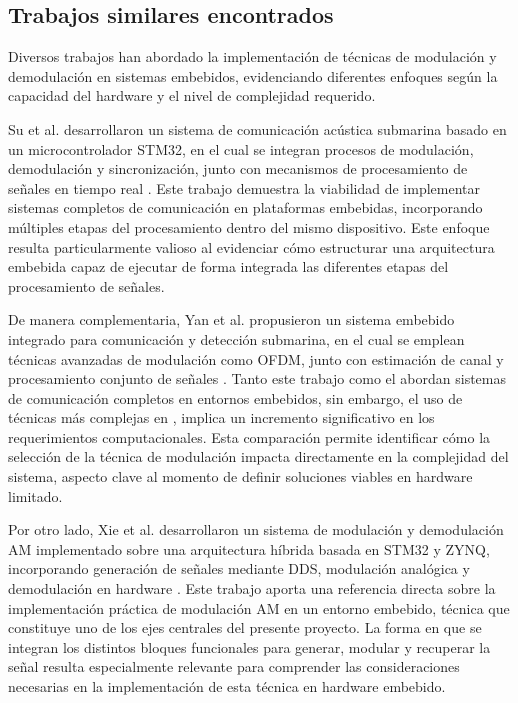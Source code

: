 \subsection{Trabajos similares encontrados}

Diversos trabajos han abordado la implementación de técnicas de modulación y demodulación en sistemas embebidos, evidenciando diferentes enfoques según la capacidad del hardware y el nivel de complejidad requerido.

Su et al. desarrollaron un sistema de comunicación acústica submarina basado en un microcontrolador STM32, en el cual se integran procesos de modulación, demodulación y sincronización, junto con mecanismos de procesamiento de señales en tiempo real \cite{stm32_comm}. Este trabajo demuestra la viabilidad de implementar sistemas completos de comunicación en plataformas embebidas, incorporando múltiples etapas del procesamiento dentro del mismo dispositivo. Este enfoque resulta particularmente valioso al evidenciar cómo estructurar una arquitectura embebida capaz de ejecutar de forma integrada las diferentes etapas del procesamiento de señales.

De manera complementaria, Yan et al. propusieron un sistema embebido integrado para comunicación y detección submarina, en el cual se emplean técnicas avanzadas de modulación como OFDM, junto con estimación de canal y procesamiento conjunto de señales \cite{yan2025_underwater}. Tanto este trabajo como el \cite{stm32_comm} abordan sistemas de comunicación completos en entornos embebidos, sin embargo, el uso de técnicas más complejas en \cite{yan2025_underwater}, implica un incremento significativo en los requerimientos computacionales. Esta comparación permite identificar cómo la selección de la técnica de modulación impacta directamente en la complejidad del sistema, aspecto clave al momento de definir soluciones viables en hardware limitado.

Por otro lado, Xie et al. desarrollaron un sistema de modulación y demodulación AM implementado sobre una arquitectura híbrida basada en STM32 y ZYNQ, incorporando generación de señales mediante DDS, modulación analógica y demodulación en hardware \cite{xie2024_am}. Este trabajo aporta una referencia directa sobre la implementación práctica de modulación AM en un entorno embebido, técnica que constituye uno de los ejes centrales del presente proyecto. La forma en que se integran los distintos bloques funcionales para generar, modular y recuperar la señal resulta especialmente relevante para comprender las consideraciones necesarias en la implementación de esta técnica en hardware embebido.

